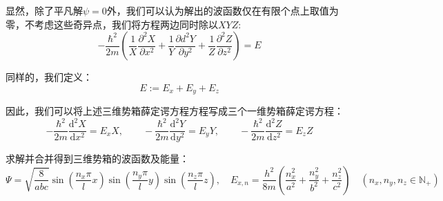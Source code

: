 显然，除了平凡解$\psi=0$外，我们可以认为解出的波函数仅在有限个点上取值为零，不考虑这些奇异点，我们将方程两边同时除以$XYZ$:
\[-\frac{\hbar^2}{2m}\left (\frac{1}{X}\frac{\partial^2X}{\partial x^2}+\frac{1}{Y}\frac{\partial{d}^2Y}{\partial y^2}+\frac{1}{Z}\frac{\partial^2Z}{\partial z^2} \right )=E\]

同样的，我们定义：
\[E:=E_x+E_y+E_z\]

因此，我们可以将上述三维势箱薛定谔方程方程写成三个一维势箱薛定谔方程：
\[-\frac{\hbar^2}{2m}\frac{\mathrm{d}^2X}{\mathrm{d}x^2}=E_xX, \qquad -\frac{\hbar^2}{2m}\frac{\mathrm{d}^2Y}{\mathrm{d}y^2}=E_yY, \qquad -\frac{\hbar^2}{2m}\frac{\mathrm{d}^2Z}{\mathrm{d}z^2}=E_zZ\]

求解并合并得到三维势箱的波函数及能量：
\[\varPsi=\sqrt{\frac{8}{abc}}\sin\left (\frac{n_x \pi}{l}x \right )\sin\left (\frac{n_y \pi}{l}y \right )\sin\left (\frac{n_z \pi}{l}z \right ), \quad E_{x,n}=\frac{h^2}{8m} \left (\frac{n_x^2}{a^2}+\frac{n_y^2}{b^2}+\frac{n_z^2}{c^2} \right ) \quad (n_x,n_y,n_z \in \mathbb{N}_+)\]

